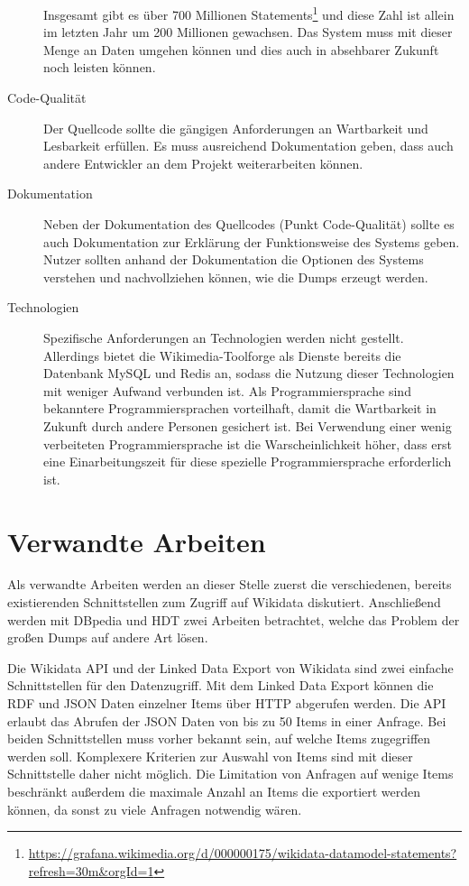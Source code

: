 \begin{description}
  Insgesamt gibt es über 700 Millionen Statements\footnote{\url{https://grafana.wikimedia.org/d/000000175/wikidata-datamodel-statements?refresh=30m&orgId=1}} und diese Zahl ist allein im letzten Jahr um 200 Millionen gewachsen. Das System muss mit dieser Menge an Daten umgehen können und dies auch in absehbarer Zukunft noch leisten können.
\item[Code-Qualität] Der Quellcode sollte die gängigen Anforderungen an Wartbarkeit und Lesbarkeit erfüllen. Es muss ausreichend Dokumentation geben, dass auch andere Entwickler an dem Projekt weiterarbeiten können.
\item[Dokumentation] Neben der Dokumentation des Quellcodes (Punkt Code-Qualität) sollte es auch Dokumentation zur Erklärung der Funktionsweise des Systems geben. Nutzer sollten anhand der Dokumentation die Optionen des Systems verstehen und nachvollziehen können, wie die Dumps erzeugt werden.
\item[Technologien] Spezifische Anforderungen an Technologien werden nicht gestellt.
  Allerdings bietet die Wikimedia-Toolforge als Dienste bereits die Datenbank MySQL und Redis an, sodass die Nutzung dieser Technologien mit weniger Aufwand verbunden ist. Als Programmiersprache sind bekanntere Programmiersprachen vorteilhaft, damit die Wartbarkeit in Zukunft durch andere Personen gesichert ist. Bei Verwendung einer wenig verbeiteten Programmiersprache ist die Warscheinlichkeit höher, dass erst eine Einarbeitungszeit für diese spezielle Programmiersprache erforderlich ist.
\end{description}

\section{Verwandte Arbeiten}
Als verwandte Arbeiten werden an dieser Stelle zuerst die verschiedenen, bereits existierenden Schnittstellen zum Zugriff auf Wikidata diskutiert.
Anschließend werden mit DBpedia und HDT zwei Arbeiten betrachtet, welche das Problem der großen Dumps auf andere Art lösen.

Die Wikidata API und der Linked Data Export von Wikidata sind zwei einfache Schnittstellen für den Datenzugriff.
Mit dem Linked Data Export können die RDF und JSON Daten einzelner Items über HTTP abgerufen werden.
Die API erlaubt das Abrufen der JSON Daten von bis zu 50 Items in einer Anfrage.
Bei beiden Schnittstellen muss vorher bekannt sein, auf welche Items zugegriffen werden soll.
Komplexere Kriterien zur Auswahl von Items sind mit dieser Schnittstelle daher nicht möglich.
Die Limitation von Anfragen auf wenige Items beschränkt außerdem die maximale Anzahl an Items die exportiert werden können, da sonst zu viele Anfragen notwendig wären.

